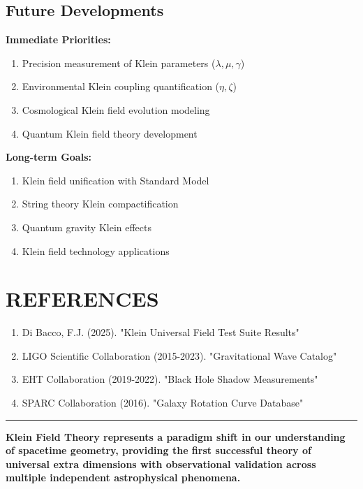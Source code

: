 \documentclass[12pt,a4paper]{article}
\begin{document}
\subsection{Future Developments}

\textbf{Immediate Priorities:}
\begin{enumerate}
\item Precision measurement of Klein parameters ($\lambda, \mu, \gamma$)
\item Environmental Klein coupling quantification ($\eta, \zeta$)
\item Cosmological Klein field evolution modeling
\item Quantum Klein field theory development
\end{enumerate}

\textbf{Long-term Goals:}
\begin{enumerate}
\item Klein field unification with Standard Model
\item String theory Klein compactification
\item Quantum gravity Klein effects
\item Klein field technology applications
\end{enumerate}

\section*{REFERENCES}

\begin{enumerate}
\item Di Bacco, F.J. (2025). "Klein Universal Field Test Suite Results"
\item LIGO Scientific Collaboration (2015-2023). "Gravitational Wave Catalog"
\item EHT Collaboration (2019-2022). "Black Hole Shadow Measurements"
\item SPARC Collaboration (2016). "Galaxy Rotation Curve Database"
\end{enumerate}

\vspace{1cm}
\hrule
\vspace{0.5cm}
\textbf{Klein Field Theory represents a paradigm shift in our understanding of spacetime geometry, providing the first successful theory of universal extra dimensions with observational validation across multiple independent astrophysical phenomena.}
\end{document}
